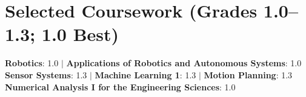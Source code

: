 \documentclass[letterpaper,11pt]{article}
\begin{document}
\section{Selected Coursework (Grades 1.0--1.3; 1.0 Best)}
 \begin{itemize}[leftmargin=0.15in, label={}]
    \small{\item{
     \textbf{Robotics}{: 1.0} $|$
     \textbf{Applications of Robotics and Autonomous Systems}{: 1.0} \\
     \textbf{Sensor Systems}{: 1.3} $|$
     \textbf{Machine Learning 1}{: 1.3} $|$
     \textbf{Motion Planning}{: 1.3} \\
     \textbf{Numerical Analysis I for the Engineering Sciences}{: 1.0}
    }}
 \end{itemize}

\end{document}
